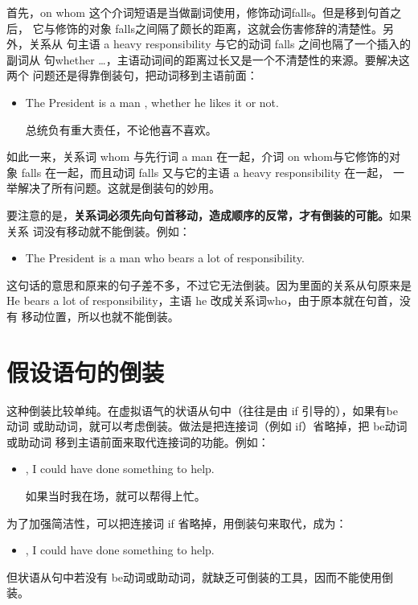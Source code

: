 首先，on whom 这个介词短语是当做副词使用，修饰动词falls。但是移到句首之后，
它与修饰的对象 falls之间隔了颇长的距离，这就会伤害修辞的清楚性。另外，关系从
句主语 a heavy responsibility 与它的动词 falls 之间也隔了一个插入的副词从
句whether \ldots{}，主语动词间的距离过长又是一个不清楚性的来源。要解决这两个
问题还是得靠倒装句，把动词移到主语前面：
\begin{itemize}
\item The President is a man ,
  whether he likes it or not.

  总统负有重大责任，不论他喜不喜欢。
\end{itemize}
如此一来，关系词 whom 与先行词 a man 在一起，介词 on whom与它修饰的对
象 falls 在一起，而且动词 falls 又与它的主语 a heavy responsibility 在一起，
一举解决了所有问题。这就是倒装句的妙用。

要注意的是，\textbf{关系词必须先向句首移动，造成顺序的反常，才有倒装的可能。}如果关系
词没有移动就不能倒装。例如：
\begin{itemize}
\item The President is a man who bears a lot of responsibility.
\end{itemize}
这句话的意思和原来的句子差不多，不过它无法倒装。因为里面的关系从句原来是He
bears a lot of responsibility，主语 he 改成关系词who，由于原本就在句首，没有
移动位置，所以也就不能倒装。

\section{假设语句的倒装}

这种倒装比较单纯。在虚拟语气的状语从句中（往往是由 if 引导的），如果有be 动词
或助动词，就可以考虑倒装。做法是把连接词（例如 if）省略掉，把 be动词或助动词
移到主语前面来取代连接词的功能。例如：
\begin{itemize}
\item {}, I could have done something to help.

  如果当时我在场，就可以帮得上忙。
\end{itemize}
为了加强简洁性，可以把连接词 if 省略掉，用倒装句来取代，成为：
\begin{itemize}
\item {}, I could have done something to help.
\end{itemize}

但状语从句中若没有 be动词或助动词，就缺乏可倒装的工具，因而不能使用倒装。


